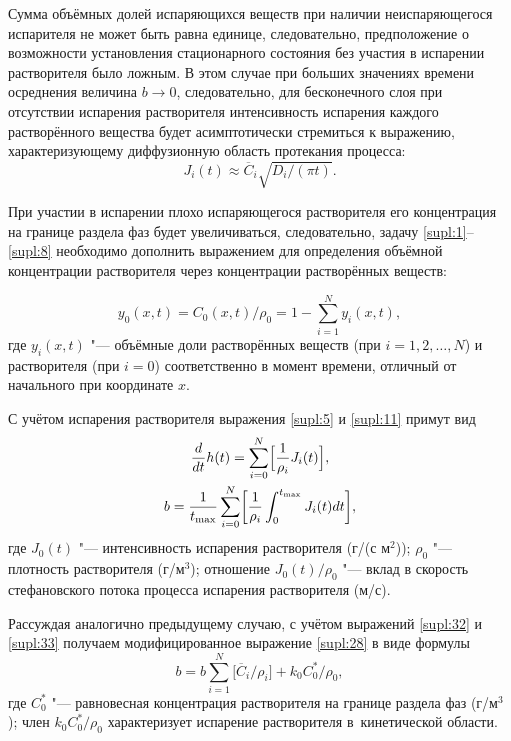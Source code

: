 Сумма объёмных долей испаряющихся веществ при наличии неиспаряющегося испарителя не может быть равна единице, следовательно, предположение о возможности установления стационарного состояния без участия в испарении растворителя было ложным. В этом случае при больших значениях времени осреднения величина $b \to 0$, следовательно, для бесконечного слоя при отсутствии испарения растворителя интенсивность испарения каждого растворённого вещества будет асимптотически стремиться к выражению, характеризующему диффузионную область протекания процесса:
\begin{equation}%
J_i(t) \approx \overline{C}_i \sqrt{D_i/(\pi t)}.
\label{supl:30}
\end{equation}


При участии в испарении плохо испаряющегося растворителя его концентрация на границе раздела фаз будет увеличиваться, следовательно, задачу \eqref{supl:1}--\eqref{supl:8} необходимо дополнить выражением для определения объёмной концентрации растворителя через концентрации растворённых веществ:

\begin{equation}%
\label{supl:31}
y_0(x,t)=C_0(x,t)/\rho_0=1-\sum \limits_{i=1}^{N}y_i(x,t),
\end{equation}
где $y_i(x,t)$ "--- объёмные доли растворённых веществ (при $i =1, 2, \dots, N$) и растворителя (при $i = 0$) соответственно в момент времени, отличный от начального при координате $x$.

С учётом испарения растворителя выражения \eqref{supl:5} и \eqref{supl:11} примут вид
\begin{gather}%
\frac{d}{dt}h(t) = \sum \limits_{i=0}^{N} \Bigl [\frac{1}{\rho_{i}}J_{i}(t) \Bigr],       
\label{supl:32}
\\%
b=\frac{1}{t_{\max}} \sum \limits_{i=0}^{N}\biggl[\frac{1}{\rho_{i}}\int _{0}^{t_{\max}} J_{i}(t)dt \biggr],   
\label{supl:33}
\end{gather}
где $J_0(t)$ "--- интенсивность испарения растворителя (г/(с м$^2$)); $\rho_0$ "--- плотность растворителя (г/м$^3$); отношение $J_0(t)/\rho_0$ "--- вклад в скорость стефановского потока процесса испарения растворителя (м/с).

Рассуждая аналогично предыдущему случаю, с учётом выражений \eqref{supl:32} и \eqref{supl:33} получаем модифицированное выражение \eqref{supl:28} в виде формулы
\begin{equation}%
b=b \sum \limits_{i=1}^{N} \bigl [ \overline{C}_i/\rho_i \bigr] + k_0 C_0^*/\rho_0, 
\label{supl:34}
\end{equation}
где $C_0^*$  "--- равновесная концентрация растворителя на границе раздела фаз (г/м$^3$); 
член  $k_0 C_0^*/\rho_0$ характеризует  испарение растворителя в~кинетической области. 

